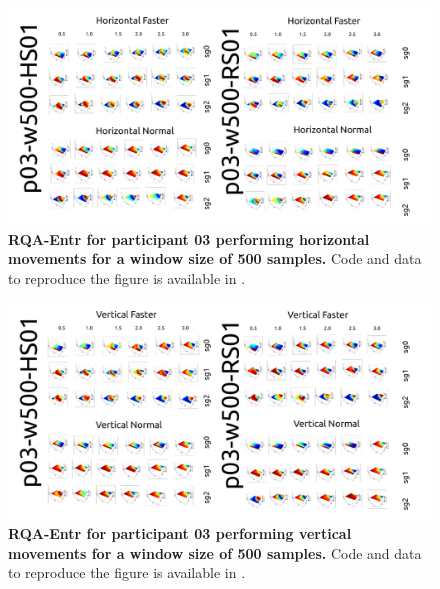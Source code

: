 \documentclass[12pt]{article}
\begin{document}


\newpage
\begin{figure}[ht!]
\centering
\includegraphics{sm-fig21}
    	\caption{
	{\bf RQA-Entr for participant 03 performing horizontal movements for a window size of 500 samples.}
	Code and data to reproduce the figure is available in \cite{srep2021}.
        }
    \label{fig-p03-H-w500}
\end{figure}
\begin{figure}[hb!]
\centering
\includegraphics{sm-fig22}
    	\caption{
	{\bf RQA-Entr for participant 03 performing vertical movements for a window size of 500 samples.}
	Code and data to reproduce the figure is available in \cite{srep2021}.
        }
    \label{fig-p03-V-w500}
\end{figure}
\end{document}
